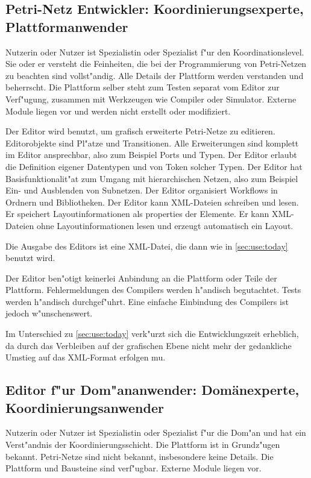 \documentclass[a4paper,12pt]{article}
\newlength{\st}\setlength{\st}{0pt}
\begin{document}
\subsection{Petri-Netz Entwickler: Koordinierungsexperte, Plattformanwender}

Nutzerin oder Nutzer ist Spezialistin oder Spezialist f"ur den
Koordinationslevel. Sie oder er versteht die Feinheiten, die bei der
Programmierung von Petri-Netzen zu beachten sind vollst"andig. Alle
Details der Plattform werden verstanden und beherrscht. Die Plattform
selber steht zum Testen separat vom Editor zur Verf"ugung, zusammen
mit Werkzeugen wie Compiler oder Simulator. Externe Module liegen vor
und werden nicht erstellt oder modifiziert.

Der Editor wird benutzt, um grafisch erweiterte Petri-Netze zu
editieren. Editorobjekte sind Pl"atze und Transitionen. Alle
Erweiterungen sind komplett im Editor ansprechbar, also zum Beispiel
Ports und Typen. Der Editor erlaubt die Definition eigener Datentypen
und von Token solcher Typen. Der Editor hat Basisfunktionalit"at zum
Umgang mit hierarchischen Netzen, also zum Beispiel Ein- und
Ausblenden von Subnetzen. Der Editor organisiert Workflows in Ordnern
und Bibliotheken. Der Editor kann XML-Dateien schreiben und lesen. Er
speichert Layoutinformationen als properties der Elemente. Er kann
XML-Dateien ohne Layoutinformationen lesen und erzeugt automatisch ein
Layout.

Die Ausgabe des Editors ist eine XML-Datei, die dann wie in
\ref{sec:use:today} benutzt wird.

Der Editor ben"otigt keinerlei Anbindung an die Plattform oder Teile
der Plattform. Fehlermeldungen des Compilers werden h"andisch
begutachtet. Tests werden h"andisch durchgef"uhrt. Eine einfache
Einbindung des Compilers ist jedoch w"unschenswert.

Im Unterschied zu \ref{sec:use:today} verk"urzt sich die
Entwicklungszeit erheblich, da durch das Verbleiben auf der grafischen
Ebene nicht mehr der gedankliche Umstieg auf das XML-Format erfolgen
mu\3.

\subsection{Editor f"ur Dom"ananwender: Dom\"anexperte, Koordinierungsanwender}

Nutzerin oder Nutzer ist Spezialistin oder Spezialist f"ur die Dom"an
und hat ein Verst"andnis der Koordinierungsschicht. Die Plattform ist
in Grundz"ugen bekannt. Petri-Netze sind nicht bekannt, insbesondere
keine Details. Die Plattform und Bausteine sind verf"ugbar. Externe
Module liegen vor.
\end{document}
